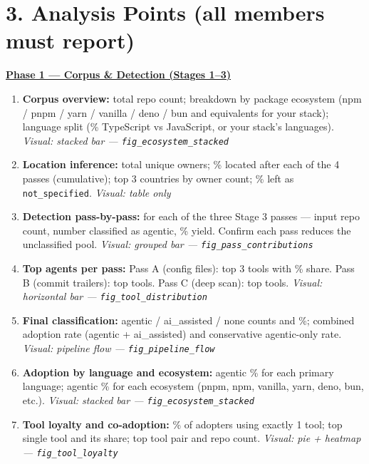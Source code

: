 \documentclass[9pt,a4paper]{article}
\begin{document}
\section*{\textcolor{stageblue}{3. Analysis Points (all members must report)}}

\noindent\textbf{\underline{Phase 1 --- Corpus \& Detection (Stages 1--3)}}
\begin{enumerate}[leftmargin=1.5em,itemsep=1pt,topsep=2pt]
  \item \textbf{Corpus overview:} total repo count; breakdown by package ecosystem
        (npm / pnpm / yarn / vanilla / deno / bun and equivalents for your stack);
        language split (\% TypeScript vs JavaScript, or your stack's languages).
        \textit{Visual: stacked bar --- \texttt{fig\_ecosystem\_stacked}}
  \item \textbf{Location inference:} total unique owners; \% located after each of the 4 passes
        (cumulative); top 3 countries by owner count; \% left as \texttt{not\_specified}.
        \textit{Visual: table only}
  \item \textbf{Detection pass-by-pass:} for each of the three Stage 3 passes --- input repo count,
        number classified as agentic, \% yield. Confirm each pass reduces the unclassified pool.
        \textit{Visual: grouped bar --- \texttt{fig\_pass\_contributions}}
  \item \textbf{Top agents per pass:} Pass A (config files): top 3 tools with \% share.
        Pass B (commit trailers): top tools. Pass C (deep scan): top tools.
        \textit{Visual: horizontal bar --- \texttt{fig\_tool\_distribution}}
  \item \textbf{Final classification:} agentic / ai\_assisted / none counts and \%;
        combined adoption rate (agentic + ai\_assisted) and conservative agentic-only rate.
        \textit{Visual: pipeline flow --- \texttt{fig\_pipeline\_flow}}
  \item \textbf{Adoption by language and ecosystem:} agentic \% for each primary language;
        agentic \% for each ecosystem (pnpm, npm, vanilla, yarn, deno, bun, etc.).
        \textit{Visual: stacked bar --- \texttt{fig\_ecosystem\_stacked}}
  \item \textbf{Tool loyalty and co-adoption:} \% of adopters using exactly 1 tool;
        top single tool and its share; top tool pair and repo count.
        \textit{Visual: pie + heatmap --- \texttt{fig\_tool\_loyalty}}
\end{enumerate}
\end{document}
